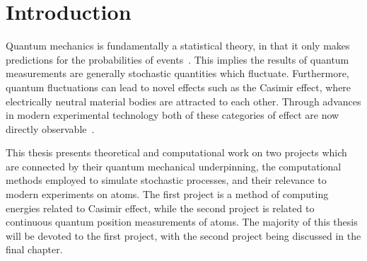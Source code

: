 \chapter{Introduction}



Quantum mechanics is fundamentally a statistical theory, in that it only makes predictions for 
the probabilities of events~\cite{Sakurai1994}.   
This implies the results of quantum measurements are generally stochastic quantities which fluctuate.
Furthermore, quantum fluctuations can lead to novel effects such as the Casimir effect, where
electrically neutral material bodies are attracted to each other.  
Through advances in modern experimental technology both of these categories of effect are now 
directly observable~\cite{WisemanMilburn2010, Dalvit2011}.  

This thesis presents theoretical and computational work on two projects which are  
connected by their quantum mechanical underpinning, the computational methods 
employed to simulate stochastic processes, and their relevance to modern experiments on atoms.  
The first project is a method of computing energies related to Casimir effect, while the second project is related to 
continuous quantum position measurements of atoms.  The majority of this thesis will be devoted
to the first project, with the second project being discussed in the final chapter.  



